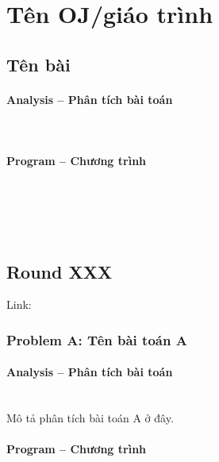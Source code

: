 
\section{Tên OJ/giáo trình}

\subsection{Tên bài}
 

\paragraph{Analysis -- Phân tích bài toán} \mbox{} \\


\paragraph{Program -- Chương trình} \mbox{} \\


\begin{lstlisting}
	
	
\end{lstlisting}
\subsection{Round XXX}
Link: \url{}

\subsubsection{Problem A: Tên bài toán A}

\paragraph{Analysis -- Phân tích bài toán} \mbox{} \\

Mô tả phân tích bài toán A ở đây.

\paragraph{Program -- Chương trình} \mbox{} \\

\begin{lstlisting}

\end{lstlisting}

